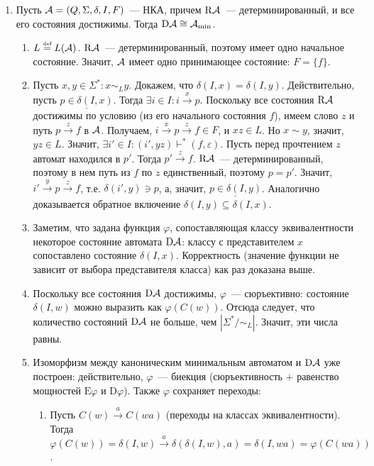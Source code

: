 \documentclass[a4paper]{article}
\def\A{{\cal A}}
\def\eqdef{\overset{\mbox{\tiny def}}{=}}
\def\D{{\mathrm{D}}}
\def\R{{\mathrm{R}}}
\begin{document}
\begin{enumerate}
\begin{itemize}
\end{itemize}
\item Пусть $\A=(Q,\Sigma,\delta,I,F)$~--- НКА, причем $\R\A$~--- детерминированный, и все его состояния достижимы. Тогда $\D\A\cong \A_{\min}$.\begin{enumerate}
\item $L\eqdef L(\A)$. $\R\A$~--- детерминированный, поэтому имеет одно начальное состояние. Значит, $\A$ имеет одно принимающее состояние: $F=\{f\}$.
\item Пусть $x,y\in\Sigma^*\colon x\sim_L y$. Докажем, что $\delta(I, x)=\delta(I, y)$.\newline
Действительно, пусть $\underline{p\in\delta(I,x)}$. Тогда $\exists i\in I\colon i\overset{x}{\to}p$. Поскольку все состояния $\R\A$ достижимы по условию (из его начального состояния $f$), имеем слово $z$ и путь $p\overset{z}{\to}f$ в $\A$. Получаем, $i\overset{x}{\to}p\overset{z}{\to}f\in F$, и $xz\in L$. Но $x\sim y$, значит, $yz\in L$. Значит, $\exists i'\in I\colon (i',yz)\vdash^*(f,\varepsilon)$. Пусть перед прочтением $z$ автомат находился в $p'$. Тогда $p'\overset{z}{\to}f$. $\R\A$~--- детерминированный, поэтому в нем путь из $f$ по $z$ единственный, поэтому $p=p'$. Значит, $i'\overset{y}{\to}p\overset{z}{\to}f$, т.е. $\delta(i',y)\ni p$, а, значит, $\underline{p\in\delta(I,y)}$. Аналогично доказывается обратное включение $\delta(I,y)\subseteq\delta(I,x)$.
\item Заметим, что задана функция $\varphi$, сопоставляющая классу эквивалентности некоторое состояние автомата $\D\A$: классу с представителем $x$ сопоставлено состояние $\delta(I,x)$. Корректность (значение функции не зависит от выбора представителя класса) как раз доказана выше.
\item Поскольку все состояния $\D\A$ достижимы, $\varphi$~--- сюръективно: состояние $\delta(I,w)$ можно выразить как $\varphi(C(w))$. Отсюда следует, что количество состояний $\D\A$ не больше, чем $|\Sigma^*/\sim_L|$. Значит, эти числа равны.
\item Изоморфизм между каноническим минимальным автоматом и $\D\A$ уже построен: действительно, $\varphi$~--- биекция (сюръективность $+$ равенство мощностей $\mbox{E}\varphi$ и $\mbox{D}\varphi$). Также $\varphi$ сохраняет переходы: \begin{enumerate}
\item Пусть $C(w)\overset{a}{\to} C(wa)$ (переходы на классах эквивалентности).\newline
Тогда $\varphi(C(w))=\delta(I,w)\overset{a}{\to}\delta(\delta(I,w),a)=\delta(I,wa)=\varphi(C(wa))$.

\end{enumerate}
\end{enumerate}
\end{enumerate}
\end{document}

